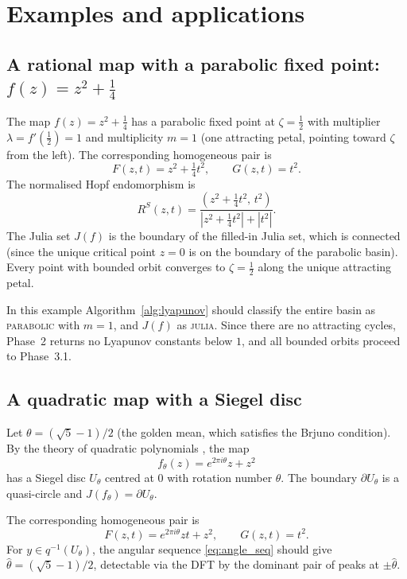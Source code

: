 \documentclass[12pt]{article}
\theoremstyle{definition}
\newcommand{\RS}{R^S}
\begin{document}
\section{Examples and applications}
\label{sec:examples}

\subsection{A rational map with a parabolic fixed point: $f(z) = z^2 + \tfrac{1}{4}$}

The map $f(z) = z^2 + \frac{1}{4}$ has a parabolic fixed point at
$\zeta = \frac{1}{2}$ with multiplier $\lambda = f'(\frac{1}{2}) = 1$
and multiplicity $m=1$ (one attracting petal, pointing toward $\zeta$
from the left).  The corresponding homogeneous pair is
\[
  F(z,t) = z^2 + \tfrac{1}{4}t^2, \qquad G(z,t) = t^2.
\]
The normalised Hopf endomorphism is
\[
  \RS(z,t) = \frac{(z^2 + \tfrac{1}{4}t^2,\, t^2)}{|z^2 +
  \tfrac{1}{4}t^2| + |t^2|}.
\]
The Julia set $J(f)$ is the boundary of the filled-in Julia set, which is
connected (since the unique critical point $z=0$ is on the boundary of
the parabolic basin).  Every point with bounded orbit converges to
$\zeta = \frac{1}{2}$ along the unique attracting petal.

In this example Algorithm~\ref{alg:lyapunov} should classify the entire
basin as \textsc{parabolic} with $m = 1$, and $J(f)$ as \textsc{julia}.
Since there are no attracting cycles, Phase~2 returns no Lyapunov
constants below $1$, and all bounded orbits proceed to Phase~3.1.

\subsection{A quadratic map with a Siegel disc}
\label{sec:example_siegel}

Let $\theta = (\sqrt{5}-1)/2$ (the golden mean, which satisfies the
Brjuno condition).  By the theory of quadratic polynomials
\cite{Siegel1942, Yoccoz1988}, the map
\[
  f_\theta(z) = e^{2\pi i\theta} z + z^2
\]
has a Siegel disc $U_\theta$ centred at $0$ with rotation number
$\theta$.  The boundary $\partial U_\theta$ is a quasi-circle and
$J(f_\theta) = \partial U_\theta$.

The corresponding homogeneous pair is
\[
  F(z,t) = e^{2\pi i\theta} zt + z^2, \qquad G(z,t) = t^2.
\]
For $y \in q^{-1}(U_\theta)$, the angular sequence \eqref{eq:angle_seq}
should give $\hat\theta = (\sqrt{5}-1)/2$, detectable via the DFT by
the dominant pair of peaks at $\pm\hat\theta$.
\end{document}
